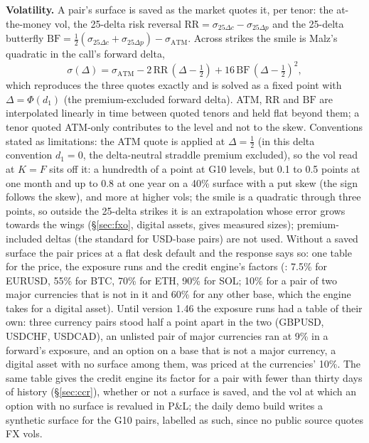 \documentclass[11pt,a4paper]{article}
\newcommand{\code}[1]{\ifmmode\text{\small\texttt{\detokenize{#1}}}\else{\small\path{#1}}\fi}
\begin{document}
\textbf{Volatility.} A pair's surface is saved as the market quotes it, per tenor: the at-the-money vol, the 25-delta risk reversal $\mathrm{RR}=\sigma_{25\Delta c}-\sigma_{25\Delta p}$ and the 25-delta butterfly $\mathrm{BF}=\tfrac12(\sigma_{25\Delta c}+\sigma_{25\Delta p})-\sigma_{\mathrm{ATM}}$. Across strikes the smile is Malz's quadratic in the call's forward delta,
\begin{equation}
\sigma(\Delta)=\sigma_{\mathrm{ATM}}-2\,\mathrm{RR}\,(\Delta-\tfrac12)+16\,\mathrm{BF}\,(\Delta-\tfrac12)^2,
\end{equation}
which reproduces the three quotes exactly and is solved as a fixed point with $\Delta=\Phi(d_1)$ (the premium-excluded forward delta). ATM, $\mathrm{RR}$ and $\mathrm{BF}$ are interpolated linearly in time between quoted tenors and held flat beyond them; a tenor quoted ATM-only contributes to the level and not to the skew. Conventions stated as limitations: the ATM quote is applied at $\Delta=\tfrac12$ (in this delta convention $d_1=0$, the delta-neutral straddle premium excluded), so the vol read at $K=F$ sits off it: a hundredth of a point at G10 levels, but 0.1 to 0.5 points at one month and up to 0.8 at one year on a 40\% surface with a put skew (the sign follows the skew), and more at higher vols; the smile is a quadratic through three points, so outside the 25-delta strikes it is an extrapolation whose error grows towards the wings (\S\ref{sec:fxo}, digital assets, gives measured sizes); premium-included deltas (the standard for USD-base pairs) are not used. Without a saved surface the pair prices at a flat desk default and the response says so: one table for the price, the exposure runs and the credit engine's factors (\code{fx\_vol.DEFAULT\_VOL\_PCT}: 7.5\% for EURUSD, 55\% for BTC, 70\% for ETH, 90\% for SOL; 10\% for a pair of two major currencies that is not in it and 60\% for any other base, which the engine takes for a digital asset). Until version 1.46 the exposure runs had a table of their own: three currency pairs stood half a point apart in the two (GBPUSD, USDCHF, USDCAD), an unlisted pair of major currencies ran at 9\% in a forward's exposure, and an option on a base that is not a major currency, a digital asset with no surface among them, was priced at the currencies' 10\%. The same table gives the credit engine its factor for a pair with fewer than thirty days of history (\S\ref{sec:ccr}), whether or not a surface is saved, and the vol at which an option with no surface is revalued in P\&L; the daily demo build writes a synthetic surface for the G10 pairs, labelled as such, since no public source quotes FX vols.
\end{document}

